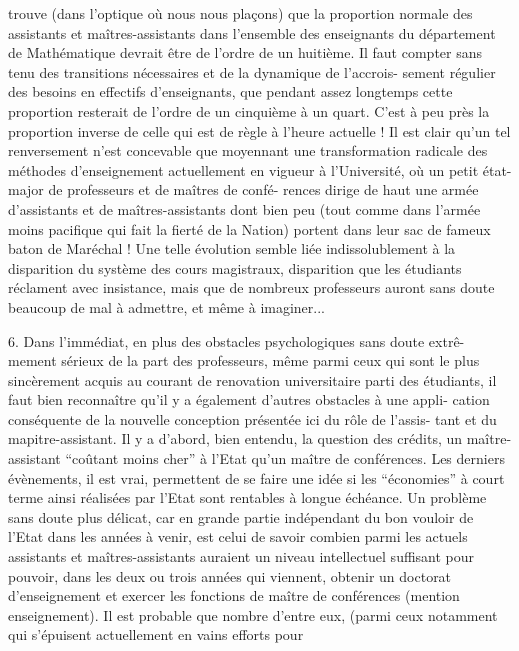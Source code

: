 
trouve (dans l'optique où nous nous plaçons) que la proportion normale des
assistants et maîtres-assistants dans l'ensemble des enseignants du département
de Mathématique devrait être de l'ordre de un huitième. Il faut compter sans
 tenu des transitions nécessaires et de la dynamique de l'accrois-%
sement régulier des besoins en effectifs d'enseignants, que pendant assez
longtemps cette proportion resterait de l'ordre de un cinquième à un quart.
C'est à peu près la proportion inverse de celle qui est de règle à l'heure
actuelle ! Il est clair qu'un tel renversement n'est concevable que moyennant
une transformation radicale des méthodes d'enseignement actuellement en vigueur
à l'Université, où un petit état-major de professeurs et de maîtres de confé-%
rences dirige de haut une armée d'assistants et de maîtres-assistants dont
bien peu (tout comme dans l'armée moins pacifique qui fait la fierté de la
Nation) portent dans leur sac de fameux baton de Maréchal ! Une telle évolution
semble liée indissolublement à la disparition du système des cours magistraux,
disparition que les étudiants réclament avec insistance, mais que de nombreux
professeurs auront sans doute beaucoup de mal à admettre, et même à imaginer...

6. Dans l'immédiat, en plus des obstacles psychologiques sans doute extrê-%
mement sérieux de la part des professeurs, même parmi ceux qui sont le plus
sincèrement acquis au courant de renovation universitaire parti des étudiants,
il faut bien reconnaître qu'il y a également d'autres obstacles à une appli-%
cation conséquente de la nouvelle conception présentée ici du rôle de l'assis-%
tant et du mapitre-assistant. Il y a d'abord, bien entendu, la question des
crédits, un maître-assistant ``coûtant moins cher'' à l'Etat qu'un maître de
conférences. Les derniers évènements, il est vrai, permettent de se faire une
idée si les ``économies'' à court terme ainsi réalisées par l'Etat sont rentables
à longue échéance. Un problème sans doute plus délicat, car en grande partie
indépendant du bon vouloir de l'Etat dans les années à venir, est celui de
savoir combien parmi les actuels assistants et maîtres-assistants auraient un
niveau intellectuel suffisant pour pouvoir, dans les deux ou trois années qui
viennent, obtenir un doctorat d'enseignement et exercer les fonctions de
maître de conférences (mention enseignement). Il est probable que nombre d'entre
eux, (parmi ceux notamment qui s'épuisent actuellement en vains efforts pour

